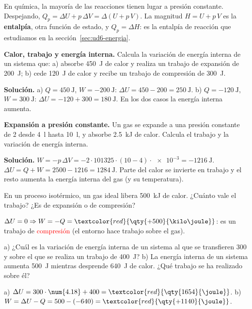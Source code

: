 \begin{remark}
    En química, la mayoría de las reacciones tienen lugar a presión constante. Despejando, \(Q_p = \Delta U + p\,\Delta V =
    \Delta(U + p\,V)\). La magnitud \(H = U + p\,V\) es la \textbf{entalpía}, otra función de estado, y \(Q_p = \Delta H\): es la
    entalpía de reacción que estudiamos en la sección~\ref{sec:ud6-energia}.
\end{remark}

\begin{example}
    \textbf{Calor, trabajo y energía interna.} Calcula la variación de energía interna de un sistema que: a) absorbe \qty{450}{\joule}
    de calor y realiza un trabajo de expansión de \qty{200}{\joule}; b) cede \qty{120}{\joule} de calor y recibe un trabajo de
    compresión de \qty{300}{\joule}.

    \textbf{Solución.} a) \(Q = \qty{+450}{\joule}\), \(W = \qty{-200}{\joule}\): \(\Delta U = 450 - 200 = \qty{+250}{\joule}\).
    b) \(Q = \qty{-120}{\joule}\), \(W = \qty{+300}{\joule}\): \(\Delta U = -120 + 300 = \qty{+180}{\joule}\). En los dos casos la
    energía interna aumenta.
\end{example}

\begin{example}
    \textbf{Expansión a presión constante.} Un gas se expande a una presión constante de \qty{2}{\atm} desde \qty{4}{\litre} hasta
    \qty{10}{\litre}, y absorbe \qty{2.5}{\kilo\joule} de calor. Calcula el trabajo y la variación de energía interna.

    \textbf{Solución.} \(W = -p\,\Delta V = -2 \cdot 101325 \cdot (10 - 4) \cdot \num{e-3} = \qty{-1216}{\joule}\).
    \(\Delta U = Q + W = 2500 - 1216 = \qty{+1284}{\joule}\). Parte del calor se invierte en trabajo y el resto aumenta la energía
    interna del gas (y su temperatura).
\end{example}

\begin{exercise}
    En un proceso isotérmico, un gas ideal libera \qty{500}{\kilo\joule} de calor. ¿Cuánto vale el trabajo? ¿Es de expansión o de
    compresión?
    \begin{solu}
        \(\Delta U = 0 \Rightarrow W = -Q = \textcolor{red}{\qty{+500}{\kilo\joule}}\): es un trabajo de
        \textcolor{red}{compresión} (el entorno hace trabajo sobre el gas).
    \end{solu}
\end{exercise}

\begin{exercise}
    a) ¿Cuál es la variación de energía interna de un sistema al que se transfieren \qty{300}{\calorie} y sobre el que se realiza un
    trabajo de \qty{400}{\joule}? b) La energía interna de un sistema aumenta \qty{500}{\joule} mientras desprende \qty{640}{\joule}
    de calor. ¿Qué trabajo se ha realizado sobre él?
    \begin{solu}
        a) \(\Delta U = 300 \cdot \num{4.18} + 400 = \textcolor{red}{\qty{1654}{\joule}}\). b) \(W = \Delta U - Q = 500 - (-640) =
        \textcolor{red}{\qty{+1140}{\joule}}\).
    \end{solu}
\end{exercise}

